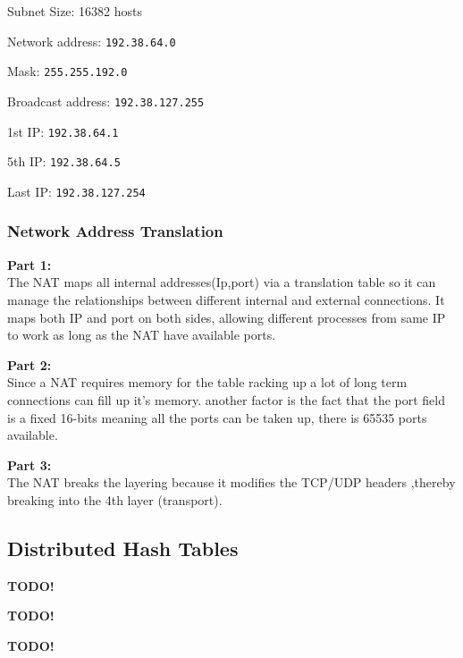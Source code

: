 \documentclass[10pt]{article}
\begin{document}
\begin{enumerate*}
  \item \begin{itemize*}
          \item Subnet Size: 16382 hosts
          \item Network address: \texttt{192.38.64.0}
          \item Mask: \texttt{255.255.192.0}
          \item Broadcast address: \texttt{192.38.127.255}
          \item 1st IP: \texttt{192.38.64.1}
          \item 5th IP: \texttt{192.38.64.5}
          \item Last IP: \texttt{192.38.127.254}
        \end{itemize*}
\end{enumerate*}


\subsubsection{Network Address Translation}

\noindent \textbf{Part 1:}\\
The NAT maps all internal addresses(Ip,port) via a translation table so it can
manage the relationships between different internal and external connections. It
maps both IP and port on both sides, allowing different processes from same IP
to work as long as the NAT have available ports.

\noindent \textbf{Part 2:}\\
Since a NAT requires memory for the table racking up a lot of long term
connections can fill up it's memory. another factor is the fact that the port
field is a fixed 16-bits meaning all the ports can be taken up, there is 65535
ports available.

\noindent \textbf{Part 3:}\\
The NAT breaks the layering because it modifies the TCP/UDP headers ,thereby
breaking into the 4th layer (transport).

\subsection{Distributed Hash Tables}
\begin{enumerate*}
  \item \textbf{TODO!}
  \item \textbf{TODO!}
  \item \textbf{TODO!}
\end{enumerate*}
\end{document}
